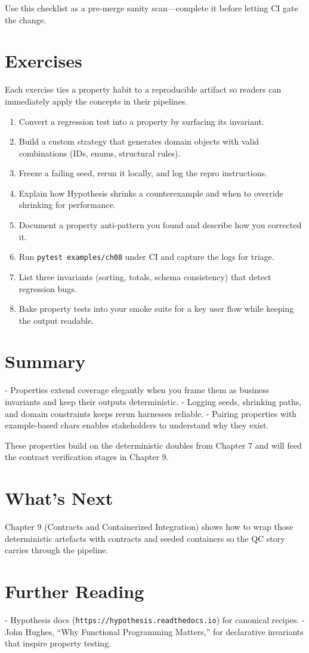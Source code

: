 Use this checklist as a pre-merge sanity scan—complete it before letting CI gate the change.

\section{Exercises}
Each exercise ties a property habit to a reproducible artifact so readers can immediately apply the concepts in their pipelines.
\begin{enumerate}
  \item Convert a regression test into a property by surfacing its invariant.
  \item Build a custom strategy that generates domain objects with valid combinations (IDs, enums, structural rules).
  \item Freeze a failing seed, rerun it locally, and log the repro instructions.
  \item Explain how Hypothesis shrinks a counterexample and when to override shrinking for performance.
  \item Document a property anti-pattern you found and describe how you corrected it.
  \item Run \texttt{pytest examples/ch08} under CI and capture the logs for triage.
  \item List three invariants (sorting, totals, schema consistency) that detect regression bugs.
  \item Bake property tests into your smoke suite for a key user flow while keeping the output readable.
\end{enumerate}

\section{Summary}
- Properties extend coverage elegantly when you frame them as business invariants and keep their outputs deterministic.
- Logging seeds, shrinking paths, and domain constraints keeps rerun harnesses reliable.
- Pairing properties with example-based chars enables stakeholders to understand why they exist.

These properties build on the deterministic doubles from Chapter 7 and will feed the contract verification stages in Chapter 9.

\section{What's Next}
Chapter 9 (Contracts and Containerized Integration) shows how to wrap those deterministic artefacts with contracts and seeded containers so the QC story carries through the pipeline.

\section{Further Reading}
- Hypothesis docs (\texttt{https://hypothesis.readthedocs.io}) for canonical recipes.  
- John Hughes, “Why Functional Programming Matters,” for declarative invariants that inspire property testing.
